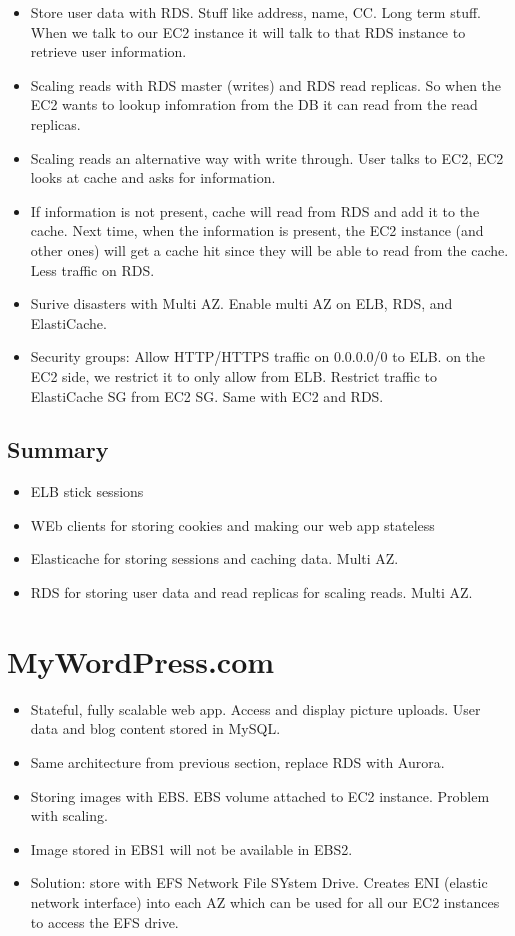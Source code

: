 \documentclass[]{scrartcl}
\begin{document}
\begin{itemize}
	\item Store user data with RDS. Stuff like address, name, CC. Long term stuff. When we talk to our EC2 instance it will talk to that RDS instance to retrieve user information. 
	\item Scaling reads with RDS master (writes) and RDS read replicas. So when the EC2 wants to lookup infomration from the DB it can read from the read replicas. 
	\item Scaling reads an alternative way with write through. User talks to EC2, EC2 looks at cache and asks for information. 
	\item If information is not present, cache will read from RDS and add it to the cache. Next time, when the information is present, the EC2 instance (and other ones) will get a cache hit since they will be able to read from the cache. Less traffic on RDS. 
	\item Surive disasters with Multi AZ. Enable multi AZ on ELB, RDS, and ElastiCache. 
	\item Security groups: Allow HTTP/HTTPS traffic on 0.0.0.0/0 to ELB. on the EC2 side, we restrict it to only allow from ELB. Restrict traffic to ElastiCache SG from EC2 SG. Same with EC2 and RDS. 
\end{itemize}

\subsection{Summary}
\begin{itemize}
	\item ELB stick sessions
	\item WEb clients for storing cookies and making our web app stateless
	\item Elasticache for storing sessions and caching data. Multi AZ. 
	\item RDS for storing user data and read replicas for scaling reads. Multi AZ. 
\end{itemize}

\section{MyWordPress.com}
\begin{itemize}
	\item Stateful, fully scalable web app. Access and display picture uploads. User data and blog content stored in MySQL.
	\item Same architecture from previous section, replace RDS with Aurora. 
	\item Storing images with EBS. EBS volume attached to EC2 instance. Problem with scaling.
	\item Image stored in EBS1 will not be available in EBS2. 
	\item Solution: store with EFS Network File SYstem Drive. Creates ENI (elastic network interface) into each AZ which can be used for all our EC2 instances to access the EFS drive. 
\end{itemize}
\end{document}
